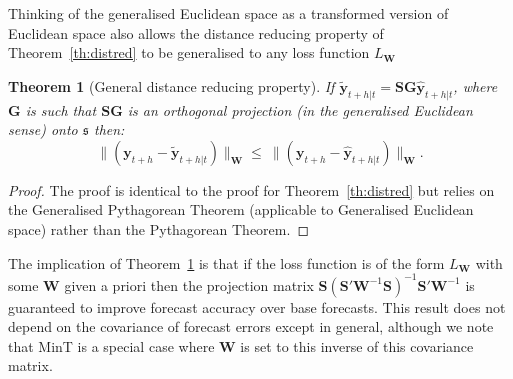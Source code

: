 \documentclass[12pt]{article}
\newtheorem{theo}{Theorem}[section]
\theoremstyle{definition}
\begin{document}

Thinking of the generalised Euclidean space as a transformed version of Euclidean space also allows the distance reducing property of Theorem~\ref{th:distred} to be generalised to any loss function $L_{\bm{W}}$

\begin{theo}[General distance reducing property]\label{th:gdistred}
  If $\tilde{\bm{y}}_{t+h|t}=\bm{S}\bm{G}\hat{\bm{y}}_{t+h|t}$, where $\bm{G}$ is such that $\bm{S}\bm{G}$ is an orthogonal projection (in the generalised Euclidean sense) onto $\mathfrak{s}$ then:
  \begin{equation*}
    \|(\bm{y}_{t+h}-\tilde{\bm{y}}_{t+h|t})\|_{\bm{W}}
      \le\
    \|(\bm{y}_{t+h}-\hat{\bm{y}}_{t+h|t})\|_{\bm{W}}.
  \end{equation*}
\end{theo}
\begin{proof}
  The proof is identical to the proof for Theorem~\ref{th:distred} but relies on the Generalised Pythagorean Theorem (applicable to Generalised Euclidean space) rather than the Pythagorean Theorem.
  \end{proof}

The implication of Theorem~\ref{th:gdistred} is that if the loss function is of the form $L_{\bm{W}}$ {\color{blue} with some $\bm{W}$ given a priori} then the projection matrix $\bm{S}(\bm{S}'\bm{W}^{-1}\bm{S})^{-1}\bm{S}'\bm{W}^{-1}$ is guaranteed to improve forecast accuracy over base forecasts.  {\color{blue}  This result does not depend on the covariance of forecast errors except in general, although we note that MinT is a special case where $\bm{W}$ is set to this inverse of this covariance matrix.}
\end{document}
